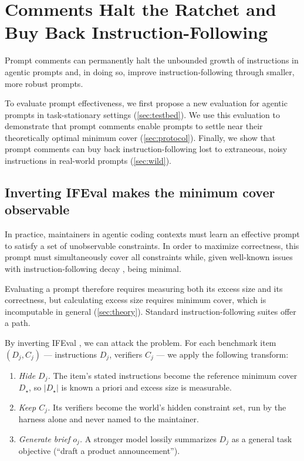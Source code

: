 

\section{Comments Halt the Ratchet and Buy Back Instruction-Following}
\label{sec:lab}

Prompt comments can permanently halt the unbounded growth of instructions in agentic prompts and, in doing
so, improve instruction-following through smaller, more robust prompts.

To evaluate prompt effectiveness, we first propose a new evaluation for agentic prompts in task-stationary
settings (\autoref{sec:testbed}). We use this evaluation to demonstrate that prompt comments enable
prompts to settle near their theoretically optimal minimum cover (\autoref{sec:protocol}). Finally, we show
that prompt comments can buy back instruction-following lost to extraneous, noisy instructions in
real-world prompts (\autoref{sec:wild}).

\subsection{Inverting IFEval makes the minimum cover observable}
\label{sec:testbed}

In practice, maintainers in agentic coding contexts must learn an effective prompt to satisfy a set of
unobservable constraints. In order to maximize correctness, this prompt must simultaneously cover all
constraints while, given well-known issues with instruction-following decay
\citep{jiang2024followbench, lior2025wildifeval}, being minimal.

Evaluating a prompt therefore requires measuring both its excess size and its correctness, but calculating
excess size requires minimum cover, which is incomputable in general (\autoref{sec:theory}). Standard
instruction-following suites offer a path.

By inverting IFEval \citep{zhou2023ifeval}, we can attack the problem. For each benchmark item $(D_j, C_j)$
--- instructions $D_j$, verifiers $C_j$ --- we apply the following transform:

\begin{enumerate}[nosep,itemsep=2pt,parsep=2pt,topsep=2pt,leftmargin=*]
  \item \emph{Hide $D_j$.} The item's stated instructions become the reference minimum cover
    $D_\star$, so $|D_\star|$ is known a priori and excess size is measurable.
  \item \emph{Keep $C_j$.} Its verifiers become the world's hidden constraint set, run by the
    harness alone and never named to the maintainer.
  \item \emph{Generate brief $o_j$.} A stronger model lossily summarizes $D_j$ as a
    general task objective (``draft a product announcement'').
\end{enumerate}

